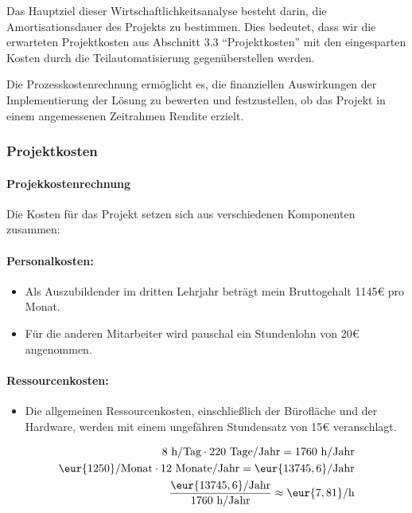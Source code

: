 Das Hauptziel dieser Wirtschaftlichkeitsanalyse besteht darin, die Amortisationsdauer des 
Projekts zu bestimmen. Dies bedeutet, dass wir die erwarteten Projektkosten aus Abschnitt 3.3 
``Projektkosten'' mit den eingesparten Kosten durch die Teilautomatisierung gegenüberstellen 
werden.

Die Prozesskostenrechnung ermöglicht es, die finanziellen Auswirkungen der 
Implementierung der Lösung zu bewerten und festzustellen, 
ob das Projekt in einem angemessenen Zeitrahmen Rendite erzielt.




\subsubsection{Projektkosten}
\label{sec:Projektkosten}

\paragraph{Projekkostenrechnung} Die Kosten für das Projekt setzen sich aus verschiedenen Komponenten zusammen:


\paragraph{Personalkosten:} 
\begin{itemize}
	\item Als Auszubildender im dritten Lehrjahr beträgt mein Bruttogehalt 1145€ pro Monat.
	\item Für die anderen Mitarbeiter wird pauschal ein Stundenlohn von 20€ angenommen.
\end{itemize}

\paragraph {Ressourcenkosten:}
\begin{itemize}
	\item 
	Die allgemeinen Ressourcenkosten, einschließlich der Bürofläche und der Hardware, 
   werden mit einem ungefähren Stundensatz von 15€ veranschlagt.
\end{itemize}


\begin{eqnarray}
8 \mbox{ h/Tag} \cdot 220 \mbox{ Tage/Jahr} = 1760 \mbox{ h/Jahr}\\
\eur{1250}\mbox{/Monat} \cdot 12 \mbox{ Monate/Jahr} = \eur{13745,6} \mbox{/Jahr}\\
\frac{\eur{13745,6} \mbox{/Jahr}}{1760 \mbox{ h/Jahr}} \approx \eur{7,81}\mbox{/h}
\end{eqnarray}

